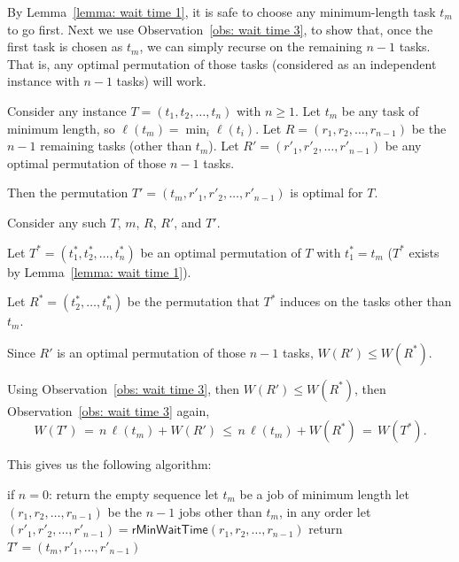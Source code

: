 By Lemma~\ref{lemma: wait time 1}, it is safe to choose any minimum-length task $t_m$ to go first.
Next we use Observation~\ref{obs: wait time 3},
to show that, once the first task is chosen as $t_m$,
we can simply recurse on the remaining $n-1$ tasks.
That is, any optimal permutation of those tasks (considered as an independent instance with $n-1$ tasks)
will work.

\begin{lemma}\label{lemma: wait time recurse}
  Consider any instance $T=(t_1, t_2, \ldots, t_n)$ with $n\ge 1$.
  Let $t_m$ be any task of minimum length, so $\ell(t_m) = \min_i \ell(t_i)$.
  Let $R=(r_1, r_2, \ldots, r_{n-1})$ be the $n-1$ remaining tasks (other than $t_m$).
  Let $R'=(r'_1, r'_2, \ldots, r'_{n-1})$ be any optimal permutation of those $n-1$ tasks.

  Then the permutation $T'=(t_m, r'_1, r'_2, \ldots, r'_{n-1})$ is optimal for $T$.
\end{lemma}
\begin{longFormProof}
  \step Consider any such $T$, $m$, $R$, $R'$, and $T'$.

  \step Let $T^*=(t^*_1, t^*_2, \ldots, t^*_{n})$ be an optimal permutation of $T$ with $t^*_1=t_m$
  ($T^*$ exists by Lemma~\ref{lemma: wait time 1}).

  \step Let $R^*=(t^*_2, \ldots, t^*_n)$ be the permutation that $T^*$ induces on the tasks other than $t_m$.

  \step Since $R'$ is an optimal permutation of those $n-1$ tasks, $W(R') \le W(R^*)$.

  \step Using  Observation~\ref{obs: wait time 3}, then $W(R') \le W(R^*)$, then Observation~\ref{obs: wait time 3} again,
  \[
    W(T') \,=\, n\, \ell(t_m) + W(R') \,\le\, n\, \ell(t_m) + W(R^*) \,=\, W(T^*).
  \]

\end{longFormProof}

This gives us the following algorithm:

\begin{myframed}
  \begin{steps}
  \item[{\textsf{rMinWaitTime}$(t_1, t_2, \ldots, t_n)$:}]
    \step if $n = 0$: return the empty sequence
    \step let $t_m$ be a job of minimum length
    \step let $(r_1, r_2, \ldots, r_{n-1})$ be the $n-1$ jobs other than $t_m$, in any order
    \step let $(r'_1, r'_2, \ldots, r'_{n-1}) = \textsf{rMinWaitTime}(r_1, r_2, \ldots, r_{n-1})$
    \step return $T'=(t_m, r'_1, \ldots, r'_{n-1})$
  \end{steps}
\end{myframed}

